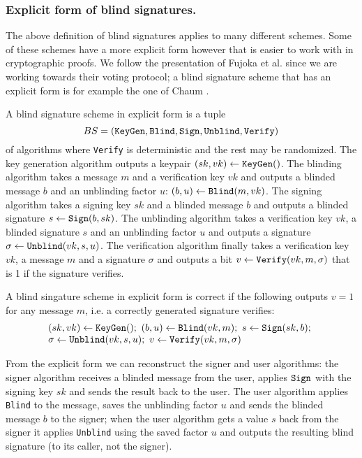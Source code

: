 \documentclass{llncs}
\newcommand{\alg}[1]{\textup{\texttt{#1}}}
\begin{document}
\subsubsection{Explicit form of blind signatures.}
The above definition of blind signatures applies to many different schemes.
Some of these schemes have a more explicit form however that is easier to work
with in cryptographic proofs. We follow the presentation of Fujoka et al. \cite{FOO92} since we are working towards their voting protocol; a blind signature scheme that has an explicit form is for example the one of Chaum \cite{C85}.

\begin{definition}
A blind signature scheme in explicit form is a tuple
\[
BS = \left( \alg{KeyGen}, \alg{Blind}, \alg{Sign}, \alg{Unblind}, \alg{Verify} \right)
\]
of algorithms where \alg{Verify} is deterministic and the rest may be
randomized. The key generation algorithm outputs a keypair $(sk, vk) \gets
\alg{KeyGen}()$. The blinding algorithm takes a message $m$ and a verification
key $vk$ and outputs a blinded message $b$ and an unblinding factor $u$: $(b, u)
\gets \alg{Blind}(m, vk)$. The signing algorithm takes a signing key $sk$ and a
blinded message $b$ and outputs a blinded signature $s \gets \alg{Sign}(b, sk)$.
The unblinding algorithm takes a verification key $vk$, a blinded signature $s$
and an unblinding factor $u$ and outputs a signature $\sigma \gets
\alg{Unblind}(vk, s, u)$. The verification algorithm finally takes a
verification key $vk$, a message $m$ and a signature $\sigma$ and outputs a bit
$v \gets \alg{Verify}(vk, m, \sigma)$ that is 1 if the signature verifies.

A blind singature scheme in explicit form is correct if the following outputs $v
= 1$ for any message $m$, i.e. a correctly generated signature verifies:
\[
\begin{array}{l}
(sk, vk) \gets \alg{KeyGen}();\ 
(b, u) \gets \alg{Blind}(vk, m);\ 
s \gets \alg{Sign}(sk, b);\ \\
\sigma \gets \alg{Unblind}(vk, s, u);\ 
v \gets \alg{Verify}(vk, m, \sigma)
\end{array}
\]
\end{definition}

From the explicit form we can reconstruct the signer and user algorithms: the
signer algorithm receives a blinded message from the user, applies $\alg{Sign}$
with the signing key $sk$ and sends the result back to the user. The user
algorithm applies \alg{Blind} to the message, saves the unblinding factor $u$
and sends the blinded message $b$ to the signer; when the user algorithm gets a
value $s$ back from the signer it applies \alg{Unblind} using the saved factor
$u$ and outputs the resulting blind signature (to its caller, not the signer).
\end{document}
